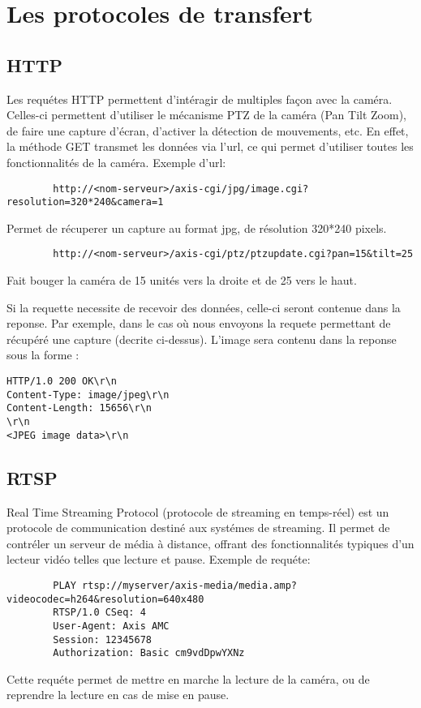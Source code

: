 	\section{Les protocoles de transfert}
		\subsection{HTTP}
		Les requétes HTTP permettent d'intéragir de multiples façon avec la caméra.
		Celles-ci permettent d'utiliser le mécanisme PTZ de la caméra (Pan Tilt
		Zoom), de faire une capture d'écran, d'activer la détection de mouvements,
		etc. 
		En effet, la méthode GET transmet les données via l'url, ce qui permet
		d'utiliser toutes les fonctionnalités de la caméra. 
		Exemple d'url:
		\begin{lstlisting}
		http://<nom-serveur>/axis-cgi/jpg/image.cgi?resolution=320*240&camera=1
		\end{lstlisting}
		Permet de récuperer un capture au format jpg, de résolution 320*240 pixels.
		\begin{lstlisting}
		http://<nom-serveur>/axis-cgi/ptz/ptzupdate.cgi?pan=15&tilt=25
		\end{lstlisting}
		Fait bouger la caméra de 15 unités vers la droite et de 25 vers le haut.
		
		Si la requette necessite de recevoir des données, celle-ci seront contenue
		dans la reponse. Par exemple, dans le cas où nous envoyons la requete 
		permettant de récupéré une capture (decrite ci-dessus). L'image sera contenu
		dans la reponse sous la forme : 
		\begin{lstlisting}
HTTP/1.0 200 OK\r\n
Content-Type: image/jpeg\r\n
Content-Length: 15656\r\n
\r\n
<JPEG image data>\r\n
\end{lstlisting}
		\subsection{RTSP}
		Real Time Streaming Protocol (protocole de streaming en temps-réel) est un
		protocole de communication destiné aux systémes de streaming. Il permet
		de contréler un serveur de média à distance, offrant des fonctionnalités
		typiques d'un lecteur vidéo telles que lecture et pause.
		Exemple de requéte:
		\begin{lstlisting}
		PLAY rtsp://myserver/axis-media/media.amp?videocodec=h264&resolution=640x480
		RTSP/1.0 CSeq: 4
		User-Agent: Axis AMC
		Session: 12345678
		Authorization: Basic cm9vdDpwYXNz
		\end{lstlisting}
		Cette requéte permet de mettre en marche la lecture de la caméra, ou de
		reprendre la lecture en cas de mise en pause.
